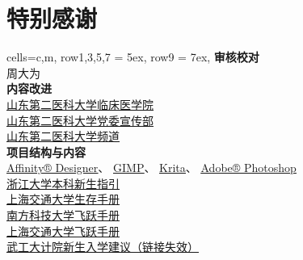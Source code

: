 \chapter*{特别感谢}
\begin{table}[H]
    \centering
    \begin{tblr}[
            theme = {no-caption},
        ]{
            cells={c,m},
            row{1,3,5,7} = {5ex},
            row{9} = {7ex},
        }
        {\large\textbf{审核校对}}                                                                      \\
        {周大为}                                                                                       \\
        {\large\textbf{内容改进}}                                                                      \\
        {
        \uline{\href{https://xchb.sdsmu.edu.cn}{山东第二医科大学临床医学院}}                           \\
        \uline{\href{https://xchb.sdsmu.edu.cn}{山东第二医科大学党委宣传部}}                           \\
        \uline{\href{https://pd.qq.com/s/7mekdr5ve}{山东第二医科大学频道}}
        }                                                                                              \\
        {\large\textbf{项目结构与内容}}                                                                \\
        {
        \uline{\href{https://affinity.serif.com/zh-cn/designer}{Affinity® Designer}}、%
        \uline{\href{https://www.gimp.org/}{GIMP}}、%
        \uline{\href{https://krita.org/zh-cn}{Krita}}、%
        \uline{\href{https://www.adobe.com/cn/creativecloud/roc/business.html}{Adobe® Photoshop}}      \\
        \uline{\href{https://zjuers.com/welcome}{浙江大学本科新生指引}}                                \\
        \uline{\href{https://github.com/SurviveSJTU/SurviveSJTUManual}{上海交通大学生存手册}}          \\
        \uline{\href{https://github.com/SUSTech-Application/SUSTechapplication}{南方科技大学飞跃手册}} \\
        \uline{\href{https://github.com/SurviveSJTU/SJTU-Application}{上海交通大学飞跃手册}}            \\
        \uline{\href{https://gitee.com/hanyaner/witjij}{武工大计院新生入学建议（链接失效）}}
}
\end{tblr}
\end{table}
